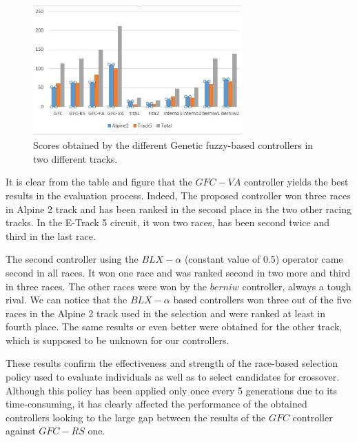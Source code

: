\documentclass[conference]{IEEEtran}
\begin{document}
\begin{figure}[!ht]	
	\begin{center}
		\includegraphics[width=8cm]{fig/gfc_races.jpg}
		\caption{Scores obtained by the different Genetic fuzzy-based controllers in two different tracks.}
		\label{fig:gfc_races}
	\end{center}
\end{figure}

It is clear from the table and figure that the $GFC-VA$ controller
yields the best results in the evaluation process. Indeed, The
proposed controller won three races in Alpine 2 track and has been
ranked in the second place in the two other racing tracks. In the E-Track 5
circuit, it won two races, has been second twice and third in
the last race.

The second controller using the $BLX-\alpha$ (constant value of 0.5)
operator came second in all races. It won one race and was ranked
second in two more and third in three races.
The other races were won by the $berniw$ controller, always a tough rival.
We can notice that the $BLX-\alpha$ based controllers won three out of the five races in the Alpine 2 track used in the selection and were ranked at least in fourth place.
The same results or even  better were obtained for the other track, which is supposed to be unknown for our controllers.

These results confirm the effectiveness and strength of the race-based selection policy used to evaluate individuals as well as to select candidates for crossover. Although this policy has been applied only once every 5 generations due to its time-consuming, it has clearly affected the performance of the obtained controllers looking to the large gap between the results of the $GFC$ controller against $GFC-RS$ one.
\end{document}
